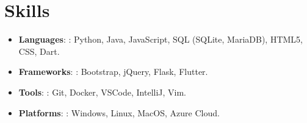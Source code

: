 \documentclass[letterpaper,11pt]{article}
\newcommand{\resumeItem}[2]{
  \item\small{
    \textbf{#1}{: #2 \vspace{-0pt}}
  }
}
\newcommand{\resumeItemListStart}{\begin{itemize}}
\newcommand{\resumeItemListEnd}{\end{itemize}\vspace{-0pt}}
\begin{document}

\section{Skills}
 \resumeItemListStart
  \resumeItem{Languages}{: Python, Java, JavaScript, SQL (SQLite, MariaDB), HTML5, CSS, Dart.}
  \resumeItem{Frameworks}{: Bootstrap, jQuery, Flask, Flutter.}
  \resumeItem{Tools}{: Git, Docker, VSCode, IntelliJ, Vim.}
  \resumeItem{Platforms}{: Windows, Linux, MacOS, Azure Cloud.}
 \resumeItemListEnd


\end{document}
